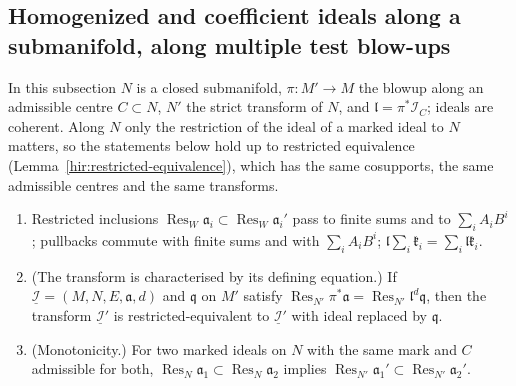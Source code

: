 \subsection{Homogenized and coefficient ideals along a submanifold, along multiple test blow-ups}

In this subsection \(N\) is a closed submanifold, \(\pi\colon M'\to M\) the blowup along an admissible centre \(C\subset N\), \(N'\) the strict transform of \(N\), and
\(\mathfrak l=\pi^*\mathcal I_C\); ideals are coherent. Along \(N\) only the restriction of the ideal of a marked ideal to \(N\) matters, so the statements below hold
up to restricted equivalence (Lemma~\ref{hir:restricted-equivalence}), which has the same cosupports, the same admissible centres and the same transforms.

\begin{lemma}
\label{mc:transform-along-calculus}
\leanok
\begin{enumerate}
\item Restricted inclusions \(\operatorname{Res}_W\mathfrak a_i\subset\operatorname{Res}_W\mathfrak a_i'\) pass to finite sums and to \(\sum_iA_iB^i\); pullbacks commute with
finite sums and with \(\sum_iA_iB^i\); \(\mathfrak l\sum_i\mathfrak k_i=\sum_i\mathfrak l\mathfrak k_i\).
\item (The transform is characterised by its defining equation.) If \(\underline{\mathcal I}=(M,N,E,\mathfrak a,d)\) and \(\mathfrak q\) on \(M'\) satisfy
\(\operatorname{Res}_{N'}\pi^*\mathfrak a=\operatorname{Res}_{N'}\mathfrak l^d\mathfrak q\), then the transform \(\underline{\mathcal I}'\) is restricted-equivalent to
\(\underline{\mathcal I}'\) with ideal replaced by \(\mathfrak q\).
\item (Monotonicity.) For two marked ideals on \(N\) with the same mark and \(C\) admissible for both, \(\operatorname{Res}_N\mathfrak a_1\subset\operatorname{Res}_N\mathfrak a_2\)
implies \(\operatorname{Res}_{N'}\mathfrak a_1'\subset\operatorname{Res}_{N'}\mathfrak a_2'\).
\end{enumerate}
\end{lemma}
